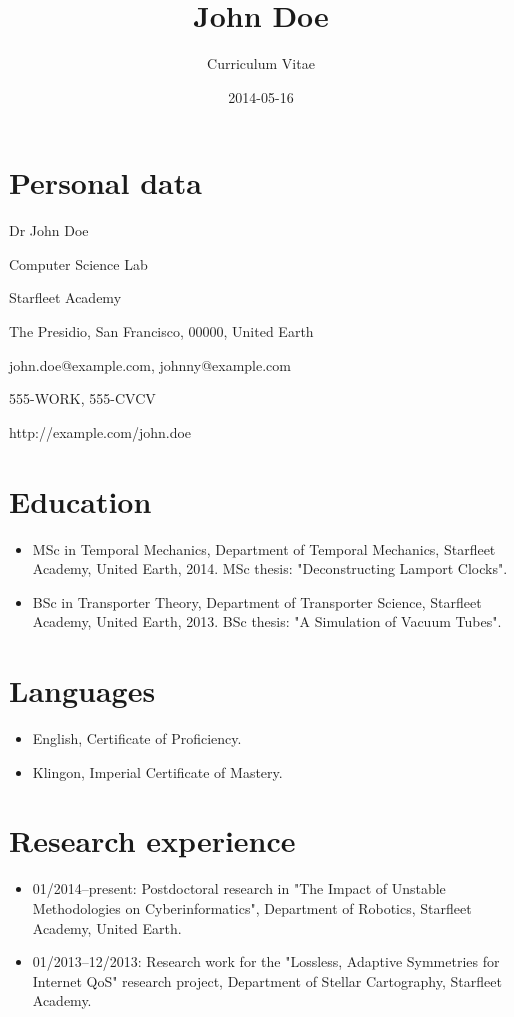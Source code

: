 \documentclass[10pt]{article}
\begin{document}
\title{John Doe}
\author{Curriculum Vitae}
\date{2014-05-16}

\maketitle

\section*{Personal data}

Dr John Doe 

Computer Science Lab

Starfleet Academy

The Presidio, San Francisco, 00000, United Earth

john.doe@example.com, johnny@example.com

555-WORK, 555-CVCV

http://example.com/john.doe

\section*{Education}

\begin{itemize}
  \item MSc in Temporal Mechanics, Department of Temporal Mechanics, Starfleet Academy, United Earth, 2014. MSc thesis: "Deconstructing Lamport Clocks".
  \item BSc in Transporter Theory, Department of Transporter Science, Starfleet Academy, United Earth, 2013. BSc thesis: "A Simulation of Vacuum Tubes".
\end{itemize}

\section*{Languages}

\begin{itemize}
  \item English, Certificate of Proficiency.
  \item Klingon, Imperial Certificate of Mastery.
\end{itemize}

\section*{Research experience}

\begin{itemize}
  \item 01/2014--present: Postdoctoral research in "The Impact of Unstable Methodologies on Cyberinformatics", Department of Robotics, Starfleet Academy, United Earth.
  \item 01/2013--12/2013: Research work for the "Lossless, Adaptive Symmetries for Internet QoS" research project, Department of Stellar Cartography, Starfleet Academy.
\end{itemize}
\end{document}
